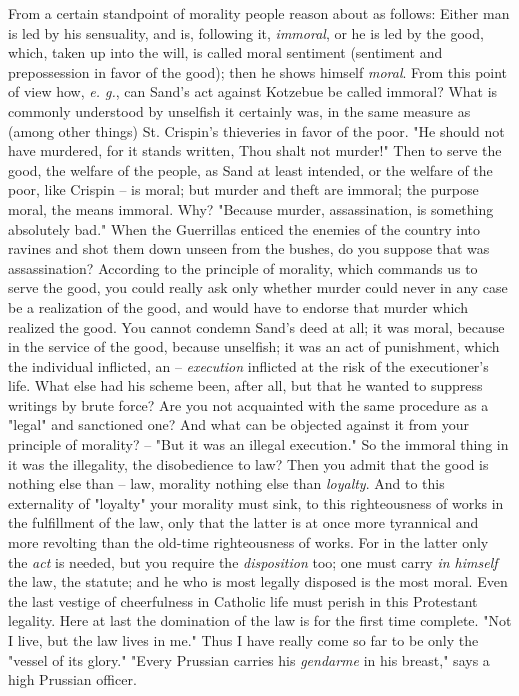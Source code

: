 \documentclass[a4paper]{book}
\begin{document}
From a certain standpoint of morality people reason about as follows: Either 
man is led by his sensuality, and is, following it, \textit{immoral}, or he is 
led by the good, which, taken up into the will, is called moral sentiment 
(sentiment and prepossession in favor of the good); then he shows himself 
\textit{moral}. From this point of view how, \textit{e. g.}, can Sand's act 
against Kotzebue be called immoral? What is commonly understood by unselfish 
it certainly was, in the same measure as (among other things) St. Crispin's 
thieveries in favor of the poor. "{}He should not have murdered, for it stands 
written, Thou shalt not murder!"{} Then to serve the good, the welfare of the 
people, as Sand at least intended, or the welfare of the poor, like Crispin -- 
is moral; but murder and theft are immoral; the purpose moral, the means 
immoral. Why? "{}Because murder, assassination, is something absolutely 
bad."{} When the Guerrillas enticed the enemies of the country into ravines 
and shot them down unseen from the bushes, do you suppose that was 
assassination? According to the principle of morality, which commands us to 
serve the good, you could really ask only whether murder could never in any 
case be a realization of the good, and would have to endorse that murder which 
realized the good. You cannot condemn Sand's deed at all; it was moral, 
because in the service of the good, because unselfish; it was an act of 
punishment, which the individual inflicted, an -- \textit{execution} inflicted 
at the risk of the executioner's life. What else had his scheme been, after 
all, but that he wanted to suppress writings by brute force? Are you not 
acquainted with the same procedure as a "{}legal"{} and sanctioned one? And 
what can be objected against it from your principle of morality? -- "{}But it 
was an illegal execution."{} So the immoral thing in it was the illegality, 
the disobedience to law? Then you admit that the good is nothing else than -- 
law, morality nothing else than \textit{loyalty}. And to this externality of 
"{}loyalty"{} your morality must sink, to this righteousness of works in the 
fulfillment of the law, only that the latter is at once more tyrannical and 
more revolting than the old-time righteousness of works. For in the latter 
only the \textit{act} is needed, but you require the \textit{disposition} too; 
one must carry \textit{in himself} the law, the statute; and he who is most 
legally disposed is the most moral. Even the last vestige of cheerfulness in 
Catholic life must perish in this Protestant legality. Here at last the 
domination of the law is for the first time complete. "{}Not I live, but the 
law lives in me."{} Thus I have really come so far to be only the "{}vessel of 
its glory."{} "{}Every Prussian carries his \textit{gendarme} in his 
breast,"{} says a high Prussian officer.
\end{document}
